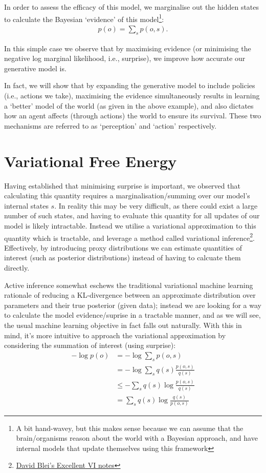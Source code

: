 \documentclass{article}
\begin{document}
In order to assess the efficacy of this model, we marginalise out the hidden states to calculate the Bayesian `evidence' of this model\footnote{A bit hand-wavey, but this makes sense because we can assume that the brain/organisms reason about the world with a Bayesian approach, and have internal models that update themselves using this framework}:
\begin{align}
    p(o) = \sum_s p(o,s).
\end{align}

In this simple case we observe that by maximising evidence (or minimising the negative log marginal likelihood, i.e., surprise), we improve how accurate our generative model is.

In fact, we will show that by expanding the generative model to include policies (i.e., actions we take), maximising the evidence simultaneously results in learning a `better' model of the world (as given in the above example), and also dictates how an agent affects (through actions) the world to ensure its survival. These two mechanisms are referred to as `perception' and `action' respectively.

\section{Variational Free Energy}

Having established that minimising surprise is important, we observed that calculating this quantity requires a marginalisation/summing over our model's internal states $s$. In reality this may be very difficult, as there could exist a large number of such states, and having to evaluate this quantity for all updates of our model is likely intractable. Instead we utilise a variational approximation to this quantity which is tractable, and leverage a method called variational inference\footnote{\href{https://www.cs.princeton.edu/courses/archive/fall11/cos597C/lectures/variational-inference-i.pdf}{David Blei's Excellent VI notes}}. Effectively, by introducing proxy distributions we can estimate quantities of interest (such as posterior distributions) instead of having to calcuate them directly. 

Active inference somewhat eschews the traditional variational machine learning rationale of reducing a KL-divergence between an approximate distribution over parameters and their true posterior (given data); instead we are looking for a way to calculate the model evidence/suprise in a tractable manner, and as we will see, the usual machine learning objective in fact falls out naturally. With this in mind, it's more intuitive to approach the variational approximation by considering the summation of interest (using surprise):
\begin{align}
    -\log p(o) &= - \log \sum_s p(o,s)\\
                &= - \log \sum_s q(s) \frac{p(o,s)}{q(s)}\\
                &\leq - \sum_s q(s) \log \frac{p(o,s)}{q(s)} \label{eq:jensen}\\
                &= \sum_s q(s) \log \frac{q(s)}{p(o,s)} \label{eq:vfe}
\end{align}
\end{document}
